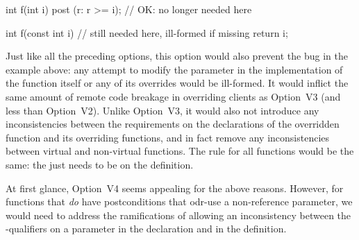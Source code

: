 \begin{codeblock}
int f(int i) post (r: r >=  i);  // OK:  no longer needed here

int f(const int i) {  //  still needed here, ill-formed if missing
  return i;
}
\end{codeblock}
Just like all the preceding options, this option would also prevent the bug in the example above: any attempt to modify the parameter in the implementation of the function itself or any of its overrides would be ill-formed. It would inflict the same amount of remote code breakage in overriding clients as Option~V3 (and less than Option~V2). Unlike Option~V3, it would also not introduce any inconsistencies between the requirements on the declarations of the overridden function and its overriding functions, and in fact remove any inconsistencies between virtual and non-virtual functions. The rule for all functions would be the same: the  just needs to be on the definition.

At first glance, Option~V4 seems appealing for the above reasons. However, for functions that \emph{do} have postconditions that odr-use a non-reference parameter, we would need to address the ramifications of allowing an inconsistency between the -qualifiers on a parameter in the declaration and in the definition.

